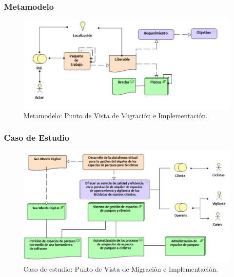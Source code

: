 \subsubsection{Metamodelo}
\begin{figure}[h]
	\centering
	\includegraphics[width=1.0\textwidth]{imagenes/Metamodelos/Migracion/meta_Migracion_implementacion.pdf}
	\caption{Metamodelo: Punto de Vista de Migración e Implementación.}
	\label{fig:gap_analysis}
\end{figure}

\subsubsection{Caso de Estudio}


\begin{figure}[h]
	\centering
	\includegraphics[width=1.0\textwidth]{imagenes/Caso_Estudio/Migracion/Migracion_Implementacion.PDF}
	\caption{Caso de estudio: Punto de Vista de Migración e Implementación.}
	\label{fig:gap_analysis}
\end{figure}

